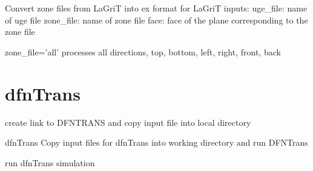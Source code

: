 \documentclass[letterpaper,10pt,english]{sphinxmanual}
\begin{document}

\begin{fulllineitems}
\label{pydfnworks:pydfnworks.flow.zone2ex}
Convert zone files from LaGriT into ex format for LaGriT
inputs:
uge\_file: name of uge file
zone\_file: name of zone file
face: face of the plane corresponding to the zone file

zone\_file='all' processes all directions, top, bottom, left, right, front, back

\end{fulllineitems}



\section{dfnTrans}
\label{pydfnworks:module-pydfnworks.transport}\label{pydfnworks:dfntrans}

\begin{fulllineitems}
\label{pydfnworks:pydfnworks.transport.copy_dfn_trans_files}
create link to DFNTRANS and copy input file into local directory

\end{fulllineitems}


\begin{fulllineitems}
\label{pydfnworks:pydfnworks.transport.dfn_trans}
dfnTrans
Copy input files for dfnTrans into working directory and run DFNTrans

\end{fulllineitems}


\begin{fulllineitems}
\label{pydfnworks:pydfnworks.transport.run_dfn_trans}
run dfnTrans simulation

\end{fulllineitems}
\end{document}
